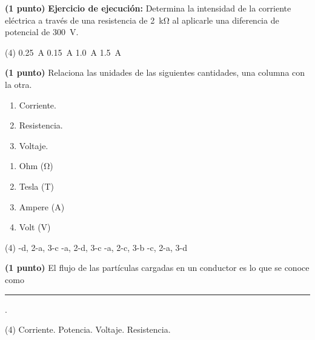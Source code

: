 \documentclass[12pt, letter]{exam}
\begin{document}
\begin{questions}
    \question\textbf{(1 punto)} \label{Problema_02} \textbf{Ejercicio de ejecución: } Determina la intensidad de la corriente eléctrica a través de una resistencia de \SI{2}{\kilo\ohm} al aplicarle una diferencia de potencial de \SI{300}{\volt}.
    \begin{tasks}(4)
        \task \SI{0.25}{\ampere}
        \task \SI{0.15}{\ampere}
        \task \SI{1.0}{\ampere}
        \task \SI{1.5}{\ampere}
    \end{tasks}
    \question\textbf{(1 punto)} Relaciona las unidades de las siguientes cantidades, una columna con la otra.
    \\
    \begin{minipage}[t]{0.4\linewidth}
        \begin{enumerate}[label=\arabic*)]
            \item Corriente.
            \item Resistencia.
            \item Voltaje.
        \end{enumerate}
    \end{minipage}
    \begin{minipage}[t]{0.4\linewidth}
        \begin{enumerate}[label=\alph*)]
            \item Ohm (\si{\ohm})
            \item Tesla (T)
            \item Ampere (\si{\ampere})
            \item Volt (\si{\volt})
        \end{enumerate}
    \end{minipage}
    \begin{tasks}(4)
        -d, 2-a, 3-c
        -a, 2-d, 3-c
        -a, 2-c, 3-b
        -c, 2-a, 3-d
    \end{tasks}
    \question\textbf{(1 punto)} El flujo de las partículas cargadas en un conductor es lo que se conoce como \rule{2cm}{0.1mm}.
    \begin{tasks}(4)
        \task Corriente.
        \task Potencia.
        \task Voltaje.
        \task Resistencia.
    \end{tasks}

    \newpage


\end{questions}
\end{document}
